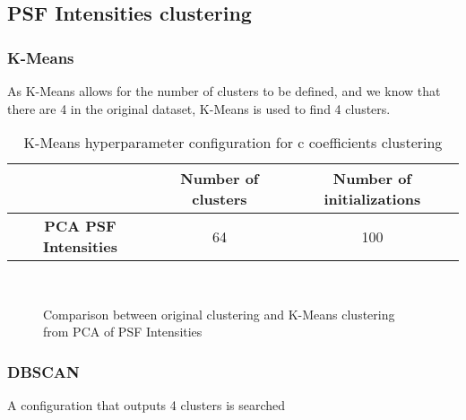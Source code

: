 	\subsection{PSF Intensities clustering}

		\subsubsection{K-Means}
			
			As K-Means allows for the number of clusters to be defined, and we know that there are 4 in the original dataset, K-Means is used to find 4 clusters.
			
			\begin{table}[h!]
				\centering
				\begin{tabular}{|c|c|c|}
					\hline
					& \textbf{Number of clusters} & \textbf{Number of initializations}\\
					\hline
					\textbf{PCA PSF Intensities} & 64 & 100\\
					\hline
				\end{tabular}
				\caption{K-Means hyperparameter configuration for c coefficients clustering}
			\end{table}
		
			\begin{figure*}[ht!]
				\centering
				\hspace{\fill}
				\\
					
				\hspace{\fill}
				\caption{Comparison between original clustering and K-Means clustering from PCA of PSF Intensities}
			\end{figure*}
			\FloatBarrier
		
		\subsubsection{DBSCAN}
			
			A configuration that outputs 4 clusters is searched
			
